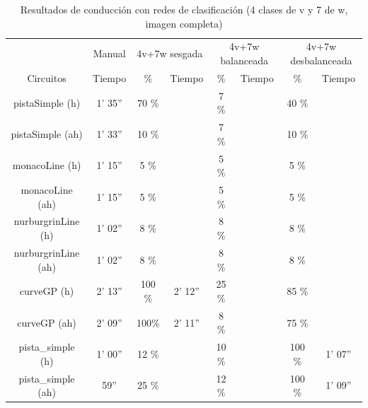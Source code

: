 \begin{table}[H]
\centering
\caption{Resultados de conducción con redes de clasificación (4 clases de v y 7 de w, imagen completa)}
\label{resultados_classificacion_normal_4v_7w}
\begin{tabular}{c|c|c|c|c|c|c|c|}
\cline{2-8}
                          & \multicolumn{1}{c|}{Manual} & \multicolumn{2}{c|}{4v+7w sesgada} & \multicolumn{2}{c|}{4v+7w balanceada} & \multicolumn{2}{c|}{4v+7w desbalanceada} \\ \cline{1-8} 
                        \multicolumn{1}{|c|}{Circuitos}    & Tiempo       & \%       & Tiempo       & \%        & Tiempo       & \%      & Tiempo     \\ \hline
\multicolumn{1}{|c|}{pistaSimple (h)}    & 1' 35''           & 70 \%         &            & 7 \%          &            & 40 \%       &       \\ \hline
\multicolumn{1}{|c|}{pistaSimple (ah)}     & 1' 33''           & 10 \%          &             & 7 \%           &           & 10 \%       &       \\ \hline
\multicolumn{1}{|c|}{monacoLine (h)}      & 1' 15''           & 5 \%           &            & 5 \%       &             & 5 \%       &           \\ \hline
\multicolumn{1}{|c|}{monacoLine (ah)}       & 1' 15''            & 5 \%       &             & 5 \%           &             & 5 \%          &        \\ \hline
\multicolumn{1}{|c|}{nurburgrinLine (h)}      & 1' 02''            & 8 \%          &            & 8 \%        &             & 8 \%       &       \\ \hline
\multicolumn{1}{|c|}{nurburgrinLine (ah)}       & 1' 02''           & 8 \%           &            & 8 \%        &            & 8 \%       &        \\ \hline
\multicolumn{1}{|c|}{curveGP (h)}     & 2' 13''           & 100 \%           & 2' 12''           & 25 \%        &            & 85 \%       &      \\ \hline
\multicolumn{1}{|c|}{curveGP (ah)}       & 2' 09''            & 100\%         & 2' 11''            & 8 \%        &            & 75 \%      &      \\ \hline
\multicolumn{1}{|c|}{pista\_simple (h)}       & 1' 00''           & 12 \%          &           & 10 \%        &             & 100 \%      & 1' 07''       \\ \hline
\multicolumn{1}{|c|}{pista\_simple (ah)}     & 59''            & 25 \%          &          & 12 \%        &             & 100 \%      & 1' 09''        \\ \hline
\end{tabular}
\end{table}

